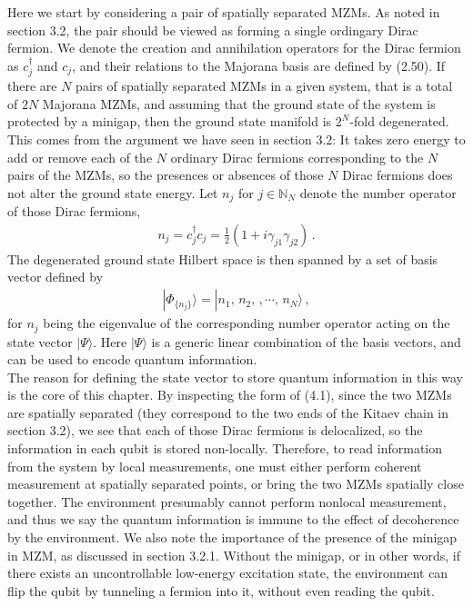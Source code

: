 \documentclass[11pt, oneside]{book}
\theoremstyle{break}
\theoremstyle{break}
\newcommand{\N}{\mathbb{N}}
\begin{document}
Here we start by considering a pair of spatially separated MZMs. As noted in section 3.2, the pair should be viewed as forming a single ordingary Dirac fermion. We denote the creation and annihilation operators for the Dirac fermion as $c^\dagger_j$ and $c_j$, and their relations to the Majorana basis are defined by (2.50). If there are $N$ pairs of spatially separated MZMs in a given system, that is a total of $2N$ Majorana MZMs, and assuming that the ground state of the system is protected by a minigap, then the ground state manifold is $2^N$-fold degenerated. This comes from the argument we have seen in section 3.2: It takes zero energy to add or remove each of the $N$ ordinary Dirac fermions corresponding to the $N$ pairs of the MZMs, so the presences or absences of those $N$ Dirac fermions does not alter the ground state energy. Let $n_j$ for $j\in \N_N$ denote the number operator of those Dirac fermions, 
\begin{align}
n_j = c_j^\dagger c_j = \frac{1}{2}\left( 1 + i\gamma_{j1}\gamma_{j2}\right)\,.
\end{align}
The degenerated ground state Hilbert space is then spanned by a set of basis vector defined by
\begin{align}
|\Phi_{\{n_j\}}\rangle = |n_1,\, n_2,\,, \cdots, \, n_N\rangle\,,
\end{align}
for $n_j$ being the eigenvalue of the corresponding number operator acting on the state vector $|\Psi\rangle$. Here $|\Psi\rangle$ is a generic linear combination of the basis vectors, and can be used to encode quantum information.\\

The reason for defining the state vector to store quantum information in this way is the core of this chapter. By inspecting the form of (4.1), since the two MZMs are spatially separated (they correspond to the two ends of the Kitaev chain in section 3.2), we see that each of those Dirac fermions is delocalized, so the information in each qubit is stored non-locally. Therefore, to read information from the system by local measurements, one must either perform coherent measurement at spatially separated points, or bring the two MZMs spatially close together. The environment presumably cannot perform nonlocal measurement, and thus we say the quantum information is immune to the effect of decoherence by the environment. We also note the importance of the presence of the minigap in MZM, as discussed in section 3.2.1. Without the minigap, or in other words, if there exists an uncontrollable low-energy excitation state, the environment can flip the qubit by tunneling a fermion into it, without even reading the qubit. 
\\
\end{document}
